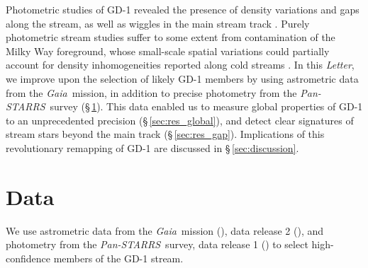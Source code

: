 \documentclass[modern]{aastex62}
\newcommand{\acronym}[1]{{\small{#1}}}
\newcommand{\gaia}{\textsl{Gaia}}
\newcommand{\pans}{\textsl{Pan-STARRS}}
\newcommand{\DR}{\acronym{DR2}}
\newcommand{\article}{\textsl{Letter}}
\newcommand{\todo}[1]{{\color{red} TODO: #1}}
\begin{document}
Photometric studies of GD-1 revealed the presence of density variations and gaps along the stream, as well as wiggles in the main stream track \citep[][]{Carlberg:2013, DeBoer:2018}.
Purely photometric stream studies suffer to some extent from contamination of the Milky Way foreground, whose small-scale spatial variations could partially account for density inhomogeneities reported along cold streams \citep[e.g.,][]{Ibata:2016}.
In this \article, we improve upon the selection of likely GD-1 members by using astrometric data from the \gaia\ mission, in addition to precise photometry from the \pans\ survey (\S\,\ref{sec:data}).
This data enabled us to measure global properties of GD-1 to an unprecedented precision (\S\,\ref{sec:res_global}), and detect clear signatures of stream stars beyond the main track (\S\,\ref{sec:res_gap}).
Implications of this revolutionary remapping of GD-1 are discussed in \S\,\ref{sec:discussion}.
%


\section{Data}
\label{sec:data}

We use astrometric data from the \gaia\ mission (\citealt{Prusti:2016}), data
release 2 (\citealt{Gaia-Collaboration:2018, Lindegren:2018}), and photometry
from the \pans\ survey, data release 1 (\citealt{Chambers:2016}) to select
high-confidence members of the GD-1 stream.
\end{document}
